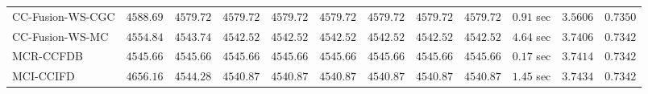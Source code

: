 \begin{table}[H]
\begin{tabular}{lrrrrrrrrrrr}
    CC-Fusion-WS-CGC & $      4588.69$ & $      4579.72$ & $      4579.72$ & $      4579.72$ & $      4579.72$ & $      4579.72$ & $      4579.72$ & $      4579.72$ & $         0.91$ sec    & $       3.5606$  & $       0.7350$ \\ 
     CC-Fusion-WS-MC & $      4554.84$ & $      4543.74$ & $      4542.52$ & $      4542.52$ & $      4542.52$ & $      4542.52$ & $      4542.52$ & $      4542.52$ & $         4.64$ sec    & $       3.7406$  & $       0.7342$ \\ 
\cmidrule{1-1} 
           MCR-CCFDB & $      4545.66$ & $      4545.66$ & $      4545.66$ & $      4545.66$ & $      4545.66$ & $      4545.66$ & $      4545.66$ & $      4545.66$ & $         0.17$ sec    & $       3.7414$  & $       0.7342$ \\ 
\cmidrule{1-1} 
           MCI-CCIFD & $      4656.16$ & $      4544.28$ & $      4540.87$ & $      4540.87$ & $      4540.87$ & $      4540.87$ & $      4540.87$ & $      4540.87$ & $         1.45$ sec    & $       3.7434$  & $       0.7342$ \\ 
\bottomrule
\end{tabular}
\end{table}

